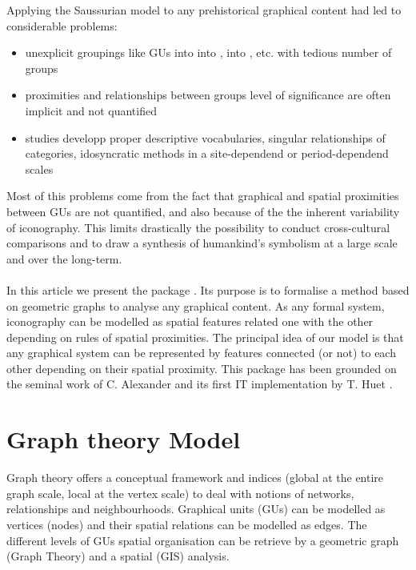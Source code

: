 \documentclass[article]{jss}\usepackage{knitr}
\begin{document}
Applying the Saussurian model to any prehistorical graphical content had led to considerable problems:
\begin{itemize}
\setlength\itemsep{.1em}
  \item unexplicit groupings like GUs into    into ,  into , etc. with tedious number of groups
  \item proximities and relationships between groups level of significance are often implicit and not quantified
  \item studies developp proper descriptive vocabularies, singular relationships of categories, idosyncratic methods in a site-dependend or period-dependend scales 
\end{itemize}

Most of this problems come from the fact that graphical and spatial proximities between GUs are not quantified, and also because of the the inherent variability of iconography. This limits drastically the possibility to conduct cross-cultural comparisons and to draw a synthesis of humankind's symbolism at a large scale and over the long-term. 
\\
\\
In this article we present the  package . Its purpose is to formalise a method based on geometric graphs to analyse any graphical content. As any formal system, iconography can be modelled as spatial features related one with the other depending on rules of spatial proximities. The principal idea of our model is that any graphical system can be represented by features connected (or not) to each other depending on their spatial proximity. This package has been grounded on the seminal work of C. Alexander \citep{Alexander08} and its first IT implementation by T. Huet \citep{Huet18a}. 

\section[Model]{Graph theory Model} \label{sec:model}

Graph theory offers a conceptual framework and indices (global at the entire graph scale, local at the vertex scale) to deal with notions of networks, relationships and neighbourhoods. Graphical units (GUs) can be modelled as vertices (nodes) and their spatial relations can be modelled as edges. The different levels of GUs spatial organisation can be retrieve by a geometric graph (Graph Theory) and a spatial (GIS) analysis.
\end{document}
